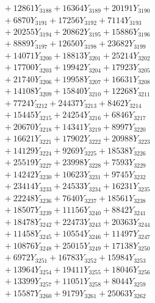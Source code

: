\documentclass[a4paper,10pt]{article}
\begin{document}
{\begin{align}
&\;  + 12861 Y_{3188} + 16364 Y_{3189} + 20191 Y_{3190} \\[0.3ex]
&\;  + 6870 Y_{3191} + 17256 Y_{3192} + 7114 Y_{3193} \\[0.3ex]
&\;  + 20255 Y_{3194} + 20862 Y_{3195} + 15886 Y_{3196} \\[0.3ex]
&\;  + 8889 Y_{3197} + 12650 Y_{3198} + 23682 Y_{3199} \\[0.3ex]
&\;  + 14071 Y_{3200} + 18813 Y_{3201} + 25214 Y_{3202} \\[0.3ex]
&\;  + 17700 Y_{3203} + 19942 Y_{3204} + 17923 Y_{3205} \\[0.3ex]
&\;  + 21740 Y_{3206} + 19958 Y_{3207} + 16631 Y_{3208} \\[0.5ex]\allowbreak
&\;  + 14108 Y_{3209} + 15840 Y_{3210} + 12268 Y_{3211} \\[0.3ex]
&\;  + 7724 Y_{3212} + 24437 Y_{3213} + 8462 Y_{3214} \\[0.3ex]
&\;  + 15445 Y_{3215} + 24254 Y_{3216} + 6846 Y_{3217} \\[0.3ex]
&\;  + 20670 Y_{3218} + 14341 Y_{3219} + 8997 Y_{3220} \\[0.3ex]
&\;  + 16621 Y_{3221} + 17902 Y_{3222} + 20988 Y_{3223} \\[0.3ex]
&\;  + 14129 Y_{3224} + 9269 Y_{3225} + 18538 Y_{3226} \\[0.3ex]
&\;  + 25519 Y_{3227} + 23998 Y_{3228} + 7593 Y_{3229} \\[0.3ex]
&\;  + 14242 Y_{3230} + 10623 Y_{3231} + 9745 Y_{3232} \\[0.3ex]
&\;  + 23414 Y_{3233} + 24533 Y_{3234} + 16231 Y_{3235} \\[0.3ex]
&\;  + 22248 Y_{3236} + 7640 Y_{3237} + 18561 Y_{3238} \\[0.5ex]\allowbreak
&\;  + 18507 Y_{3239} + 11156 Y_{3240} + 8842 Y_{3241} \\[0.3ex]
&\;  + 18478 Y_{3242} + 22473 Y_{3243} + 20363 Y_{3244} \\[0.3ex]
&\;  + 11458 Y_{3245} + 10554 Y_{3246} + 11497 Y_{3247} \\[0.3ex]
&\;  + 10876 Y_{3248} + 25015 Y_{3249} + 17138 Y_{3250} \\[0.3ex]
&\;  + 6972 Y_{3251} + 16783 Y_{3252} + 15984 Y_{3253} \\[0.3ex]
&\;  + 13964 Y_{3254} + 19411 Y_{3255} + 18046 Y_{3256} \\[0.3ex]
&\;  + 13399 Y_{3257} + 11051 Y_{3258} + 8044 Y_{3259} \\[0.3ex]
&\;  + 15587 Y_{3260} + 9179 Y_{3261} + 25063 Y_{3262} \\[0.3ex]

\end{align}}
\end{document}
